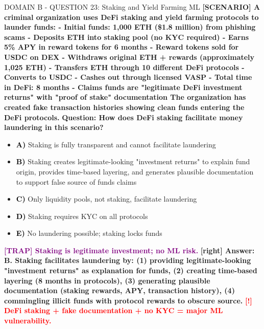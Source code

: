 \documentclass[11pt,a4paper]{beamer}
\newcommand{\redflag}[1]{\textcolor{red}{\textbf{[!] #1}}}
\newcommand{\trap}[1]{\textcolor{purple}{\textbf{[TRAP] #1}}}
\newcommand{\correct}[1]{\textcolor{green!50!black}{\textbf{[right] #1}}}
\newcommand{\scenario}[1]{\textcolor{blue!70!black}{\textbf{[SCENARIO] #1}}}
\newcommand{\option}[1]{\textcolor{black}{\textbf{#1}}}
\begin{document}
\begin{frame}{DOMAIN B - QUESTION 23: Staking and Yield Farming ML}
\scenario{A criminal organization uses DeFi staking and yield farming protocols to launder funds:
- Initial funds: 1,000 ETH (\$1.8 million) from phishing scams
- Deposits ETH into staking pool (no KYC required)
- Earns 5\% APY in reward tokens for 6 months
- Reward tokens sold for USDC on DEX
- Withdraws original ETH + rewards (approximately 1,025 ETH)
- Transfers ETH through 10 different DeFi protocols
- Converts to USDC
- Cashes out through licensed VASP
- Total time in DeFi: 8 months
- Claims funds are "legitimate DeFi investment returns" with "proof of stake" documentation
The organization has created fake transaction histories showing clean funds entering the DeFi protocols.}
\vspace{0.2cm}
\textbf{Question: How does DeFi staking facilitate money laundering in this scenario?}
\vspace{0.1cm}
\begin{itemize}
    \item \option{A)} Staking is fully transparent and cannot facilitate laundering
    \item \option{B)} Staking creates legitimate-looking "investment returns" to explain fund origin, provides time-based layering, and generates plausible documentation to support false source of funds claims
    \item \option{C)} Only liquidity pools, not staking, facilitate laundering
    \item \option{D)} Staking requires KYC on all protocols
    \item \option{E)} No laundering possible; staking locks funds
\end{itemize}
\vspace{0.2cm}
\trap{Staking is legitimate investment; no ML risk.}
\correct{Answer: B. Staking facilitates laundering by: (1) providing legitimate-looking "investment returns" as explanation for funds, (2) creating time-based layering (8 months in protocols), (3) generating plausible documentation (staking rewards, APY, transaction history), (4) commingling illicit funds with protocol rewards to obscure source.}
\redflag{DeFi staking + fake documentation + no KYC = major ML vulnerability.}
\end{frame}
\end{document}
